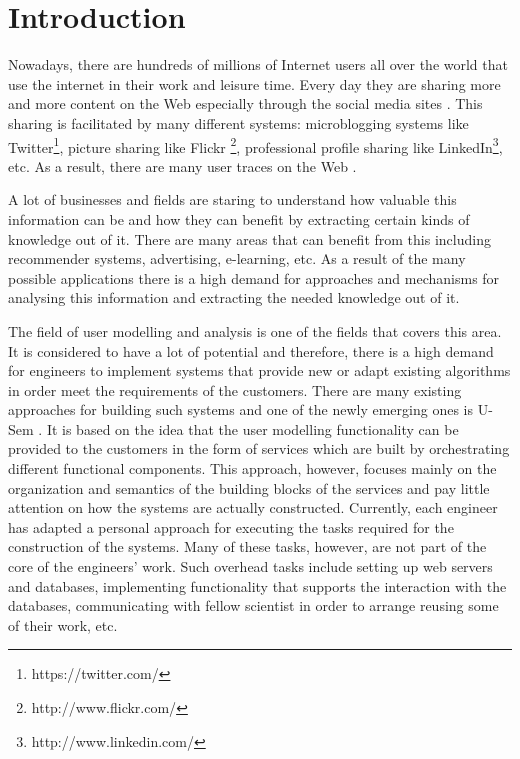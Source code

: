 
\chapter{\label{cha:intro}Introduction}

Nowadays, there are hundreds of millions of Internet users all over the world that use the internet in their work and leisure time. Every day they are sharing more and more content on the Web especially through the social media sites \cite{On social Web sites}. This sharing is facilitated by many different systems: microblogging systems like Twitter\footnote{https://twitter.com/}, picture sharing like Flickr \footnote{http://www.flickr.com/}, professional profile sharing like LinkedIn\footnote{http://www.linkedin.com/}, etc. As a result, there are many user traces on the Web \cite{Abel10}.

A lot of businesses and fields are staring to understand how valuable this information can be and how they can benefit by extracting certain kinds of knowledge out of it. There are many areas that can benefit from this including recommender systems, advertising, e-learning, etc. As a result of the many possible applications there is a high demand for approaches and mechanisms for analysing this information and extracting the needed knowledge out of it. 

The field of user modelling and analysis is one of the fields that covers this area. It is considered to have a lot of potential \cite{Kobsa07} and therefore, there is a high demand for engineers to implement systems that provide new or adapt existing algorithms in order meet the requirements of the customers. There are many existing approaches for building such systems \cite{Kobsa} and one of the newly emerging ones is U-Sem \cite{Fabien}. It is based on the idea that the user modelling functionality can be provided to the customers in the form of services which are built by orchestrating different functional components. This approach, however, focuses mainly on the organization and semantics of the building blocks of the services and pay little attention on how the systems are actually constructed. Currently, each engineer has adapted a personal approach for executing the tasks required for the construction of the systems. Many of these tasks, however, are not part of the core of the engineers' work. Such overhead tasks include setting up web servers and databases, implementing functionality that supports the interaction with the databases, communicating with fellow scientist in order to arrange reusing some of their work, etc. 

